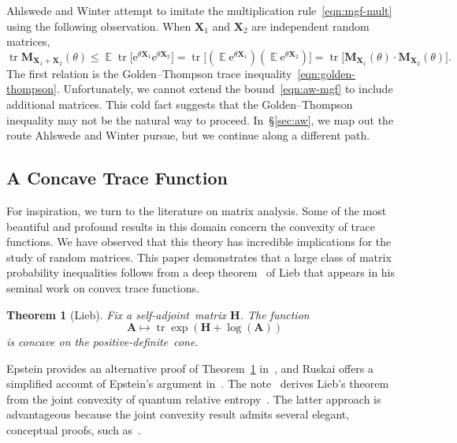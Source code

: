 \documentclass[11pt,letterpaper,twoside,reqno,draft]{amsart}
\newtheorem{thm}{Theorem}
\theoremstyle{remark}
\numberwithin{equation}{section}
\numberwithin{thm}{section}
\begin{document}
Ahlswede and Winter attempt to imitate the multiplication rule~\eqref{eqn:mgf-mult} using the following observation.  When ${\bm{{X}}}_1$ and ${\bm{{X}}}_2$ are independent random matrices,
\begin{equation} \label{eqn:aw-mgf}
{\operatorname{tr}} {\bm{{M}}}_{{\bm{{X}}}_1 + {\bm{{X}}}_2}(\theta)
	\leq {\operatorname{\mathbb{E}}} {\operatorname{tr}} \big[ {\mathrm{e}}^{\theta {\bm{{X}}}_1} {\mathrm{e}}^{\theta {\bm{{X}}}_2} \big]
	= {\operatorname{tr}}\big[ ({\operatorname{\mathbb{E}}} {\mathrm{e}}^{\theta {\bm{{X}}}_1})({\operatorname{\mathbb{E}}} {\mathrm{e}}^{\theta {\bm{{X}}}_2})\big]
	= {\operatorname{tr}} \big[ {\bm{{M}}}_{{\bm{{X}}}_1}(\theta) \cdot {\bm{{M}}}_{{\bm{{X}}}_2}(\theta) \big].
\end{equation}
The first relation is the Golden--Thompson trace inequality~\eqref{eqn:golden-thompson}.  Unfortunately, we cannot extend the bound~\eqref{eqn:aw-mgf} to include additional matrices.
This cold fact suggests that the Golden--Thompson inequality may not be the natural way to proceed.  In~\S\ref{sec:aw}, we map out the route Ahlswede and Winter pursue, but we continue along a different path.

\subsection{A Concave Trace Function} \label{sec:lieb}

For inspiration, we turn to the literature on matrix analysis.  Some of the most beautiful and profound results in this domain concern the convexity of trace functions.  We have observed that this theory has incredible implications for the study of random matrices.  This paper demonstrates that a large class of matrix probability inequalities follows from a deep theorem~\cite[Thm.~6]{Lie73:Convex-Trace} of Lieb that appears in his seminal work on convex trace functions.

\begin{thm}[Lieb] \label{thm:lieb}
Fix a self-adjoint~matrix ${\bm{{H}}}$.  The function
$$
{\bm{{A}}} \longmapsto {\operatorname{tr}} \exp( {\bm{{H}}} + \log({\bm{{A}}}))
$$
is concave on the positive-definite~cone.
\end{thm}

Epstein provides an alternative proof of Theorem~\ref{thm:lieb} in~\cite[Sec.~II]{Eps73:Remarks-Two}, and Ruskai offers a simplified account of Epstein's argument in~\cite{Rus02:Inequalities-Quantum,Rus05:Erratum-Inequalities}.  The note~\cite{Tro11:Joint-Convexity} derives Lieb's theorem from the joint convexity of quantum relative entropy~\cite[Lem.~2]{Lin74:Expectations-Entropy}. The latter approach is advantageous because the joint convexity result admits several elegant, conceptual proofs, such as~\cite[Cor.~2.2]{Eff09:Matrix-Convexity}.
\end{document}
